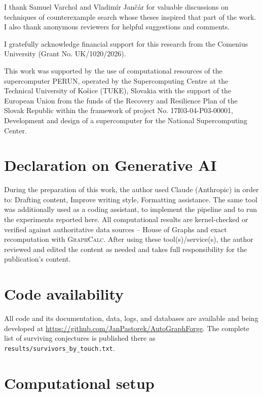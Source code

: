 \documentclass[]{ceurart}
\begin{document}
\begin{acknowledgments}
  I thank Samuel Varchol and Vladimír Jančár for valuable discussions on techniques of counterexample search whose theses inspired that part of the work. I also thank anonymous reviewers for helpful suggestions and comments.
  
  I gratefully acknowledge financial support for this research from the Comenius University (Grant No. UK/1020/2026).

  This work was supported by the use of computational resources of the supercomputer PERUN, operated by the Supercomputing Centre at the Technical University of Košice (TUKE), Slovakia with the support of the European Union from the funds of the Recovery and Resilience Plan of the Slovak Republic within the framework of project No. 17I03-04-P03-00001, Development and design of a supercomputer for the National Supercomputing Center.


\end{acknowledgments}

\section*{Declaration on Generative AI}
During the preparation of this work, the author used Claude (Anthropic) in order
to: Drafting content, Improve writing style, Formatting assistance. The same
tool was additionally used as a coding assistant, to
implement the pipeline and to run the experiments reported here. All
computational results are kernel-checked or verified against authoritative data
sources -- House of Graphs and exact recomputation with \textsc{GraphCalc}.
After using these tool(s)/service(s), the author reviewed and edited the content
as needed and takes full responsibility for the publication's content.

\section*{Code availability}
All code and its documentation, data, logs, and databases are available and being developed at \url{https://github.com/JanPastorek/AutoGraphForge}.
The complete list of surviving conjectures is published there as
\texttt{results/survivors\_by\_touch.txt}.



\appendix

\section{Computational setup}
\label{app:compute}
\label{app:partitions}
\end{document}
